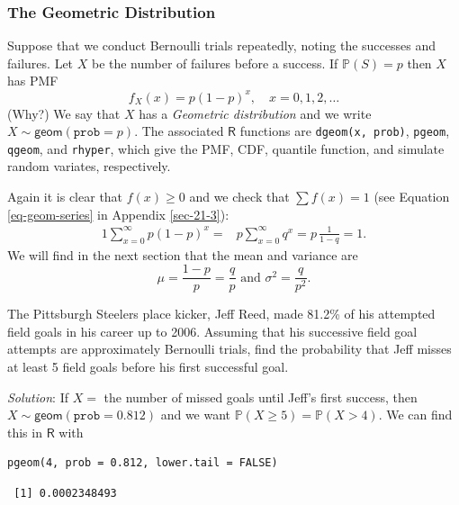 \documentclass[captions=tableheading]{scrbook}
\begin{document}
\subsubsection{The Geometric Distribution}
\label{sec-5-6-2-1}
\label{sub-The-Geometric-Distribution}


Suppose that we conduct Bernoulli trials repeatedly, noting the successes and failures. Let \(X\) be the number of failures before a success. If \(\mathbb{P}(S)=p\) then \(X\) has PMF
\begin{equation}
f_{X}(x)=p(1-p)^{x},\quad x=0,1,2,\ldots
\end{equation}
(Why?) We say that \(X\) has a \emph{Geometric distribution} and we write \(X\sim\mathsf{geom}(\mathtt{prob}=p)\). The associated \(\mathsf{R}\) functions are \texttt{dgeom(x, prob)}, \texttt{pgeom}, \texttt{qgeom}, and \texttt{rhyper}, which give the PMF, CDF, quantile function, and simulate random variates, respectively.

Again it is clear that \(f(x)\geq0\) and we check that \(\sum f(x)=1\) (see Equation \ref{eq-geom-series} in Appendix \ref{sec-21-3}):
\begin{alignat*}{1}
\sum_{x=0}^{\infty}p(1-p)^{x}= & p\sum_{x=0}^{\infty}q^{x}=p\,\frac{1}{1-q}=1.
\end{alignat*}
We will find in the next section that the mean and variance are
\begin{equation}
\mu=\frac{1-p}{p}=\frac{q}{p}\mbox{ and }\sigma^{2}=\frac{q}{p^{2}}.
\end{equation}


\begin{example}
The Pittsburgh Steelers place kicker, Jeff Reed, made 81.2\% of his attempted field goals in his career up to 2006. Assuming that his successive field goal attempts are approximately Bernoulli trials, find the probability that Jeff misses at least 5 field goals before his first successful goal.

\emph{Solution}: If \(X=\) the number of missed goals until Jeff's first success, then \(X\sim\mathsf{geom}(\mathtt{prob}=0.812)\) and we want \(\mathbb{P}(X\geq5)=\mathbb{P}(X>4)\). We can find this in \(\mathsf{R}\) with


\lstset{language=R}
\begin{lstlisting}
pgeom(4, prob = 0.812, lower.tail = FALSE)
\end{lstlisting}

\begin{verbatim}
 [1] 0.0002348493
\end{verbatim}

\end{example}
\end{document}
